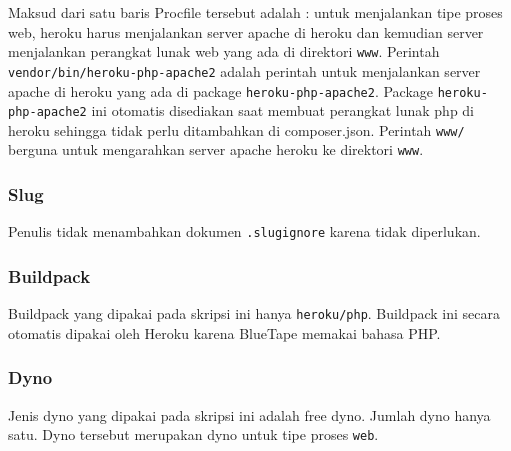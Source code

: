 		Maksud dari satu baris Procfile tersebut adalah : untuk menjalankan tipe proses web, heroku harus menjalankan server apache di heroku dan kemudian server menjalankan perangkat lunak web yang ada di direktori \texttt{www}. Perintah \texttt{vendor/bin/heroku-php-apache2} adalah perintah untuk menjalankan server apache di heroku yang ada di package \texttt{heroku-php-apache2}. Package \texttt{heroku-php-apache2} ini otomatis disediakan saat membuat perangkat lunak php di heroku sehingga tidak perlu ditambahkan di composer.json. Perintah \texttt{www/} berguna untuk mengarahkan server apache heroku ke direktori \texttt{www}.
		
	\subsubsection{Slug}
		Penulis tidak menambahkan dokumen \texttt{.slugignore} karena tidak diperlukan.
		
	\subsubsection{Buildpack}
		Buildpack yang dipakai pada skripsi ini hanya \texttt{heroku/php}. Buildpack ini secara otomatis dipakai oleh Heroku karena BlueTape memakai bahasa PHP.
		
	\subsubsection{Dyno}
		Jenis dyno yang dipakai pada skripsi ini adalah free dyno. Jumlah dyno hanya satu. Dyno tersebut merupakan dyno untuk tipe proses \texttt{web}.
		
